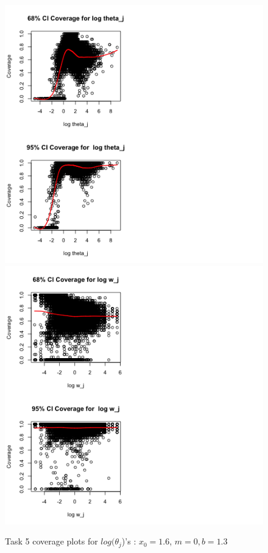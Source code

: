 \documentclass[paper=a4, fontsize=11pt]{scrartcl}
\begin{document}
\begin{figure}[h!]
  \caption{Task 5 coverage plots for $log(\theta_{j}$)'s : $x_0 = 1.6$, $m = 0, b = 1.3$}
  \centering
	\includegraphics[scale=1, trim = 80 0 150 0]{keskici_wxiao_ps2_task5_plot1.png}
		\includegraphics[scale=1, trim = 100 0 300 0]{keskici_wxiao_ps2_task5_plot2.png}
\end{figure}
\end{document}
